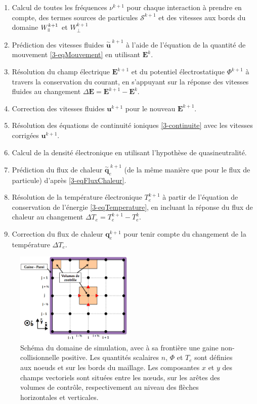 \begin{refsection}
\begin{enumerate}
  \item Calcul de toutes les fréquences $\nu^{k+1}$ pour
  chaque interaction à prendre en compte, des termes sources de particules
  $\mathcal{S}^{k+1}$ et des vitesses aux bords du domaine $W_{\para}^{k+1}$ et
  $W_{\perp}^{k+1}$
  \item Prédiction des vitesses fluides ${\overset{\sim}{\mathbf u}}^{\;k+1}$ à
  l'aide de l'équation de la quantité de mouvement \eqref{3-eqMouvement} en
  utilisant $\mathbf E^{k}$.
  \item Résolution du champ électrique $\mathbf E^{k+1}$ et du potentiel
  électrostatique $\Phi^{k+1}$ à travers la conservation du courant, en
  s'appuyant sur la réponse des vitesses fluides au changement $\Delta \mathbf
  E=\mathbf E^{k+1}-\mathbf E^{k}$.
  \item Correction des vitesses fluides $\mathbf u^{k+1}$ pour le nouveau
  $\mathbf E^{k+1}$.
  \item Résolution des équations de continuité ioniques \eqref{3-continuite} avec les
  vitesses corrigées $\mathbf u^{k+1}$.
  \item Calcul de la densité électronique en utilisant l'hypothèse de
  quasineutralité.
  \item Prédiction du flux de chaleur ${\overset{\sim}{\mathbf q}}_e^{\;k+1}$
  (de la même manière que pour le flux de particule) d'après
  \eqref{3-eqFluxChaleur}.
  \item Résolution de la température électronique $T_e^{k+1}$ à partir de
  l'équation de conservation de l'énergie \eqref{3-eqTemperature}, en incluant la réponse du flux de
  chaleur au changement $\Delta T_e=T_e^{k+1}-T_e^{k}$.
  \item Correction du flux de chaleur $\mathbf
  q_e^{k+1}$ pour tenir compte du changement de la température $\Delta T_e$.
\end{enumerate}

\begin{figure}[!htbp]
\centering
\includegraphics[width=0.5\textwidth]{figures/3-magnisGrid.png}
{\caption{Schéma du domaine de simulation, avec à sa frontière une gaine
non-collisionnelle positive.
Les quantités scalaires $n$, $\Phi$ et $T_e$ sont définies aux noeuds et sur les
bords du maillage. Les composantes $x$ et $y$ des champs vectoriels sont
situées entre les n\oe uds, sur les arêtes des volumes de contrôle,
respectivement au niveau des flèches horizontales et verticales.}
\label{3-maillage}}
\end{figure}


\end{refsection}
